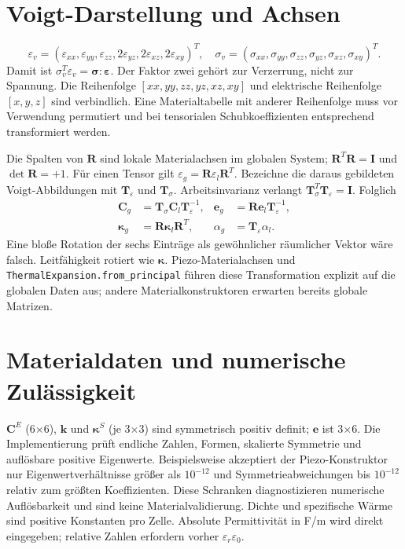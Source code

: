 \section{Voigt-Darstellung und Achsen}
\begin{equation}\label{eq:voigt}
\varepsilon_v=(\varepsilon_{xx},\varepsilon_{yy},\varepsilon_{zz},
2\varepsilon_{yz},2\varepsilon_{xz},2\varepsilon_{xy})^T,
\quad
\sigma_v=(\sigma_{xx},\sigma_{yy},\sigma_{zz},
\sigma_{yz},\sigma_{xz},\sigma_{xy})^T.
\end{equation}
Damit ist $\sigma_v^T\varepsilon_v=\boldsymbol\sigma:\boldsymbol\varepsilon$.
Der Faktor zwei gehört zur Verzerrung, nicht zur Spannung. Die Reihenfolge
$[xx,yy,zz,yz,xz,xy]$ und elektrische Reihenfolge $[x,y,z]$ sind verbindlich.
Eine Materialtabelle mit anderer Reihenfolge muss vor Verwendung permutiert
und bei tensorialen Schubkoeffizienten entsprechend transformiert werden.

Die Spalten von $\mathbf R$ sind lokale Materialachsen im globalen System;
$\mathbf R^T\mathbf R=\mathbf I$ und $\det\mathbf R=+1$. Für einen Tensor gilt
$\varepsilon_g=\mathbf R\varepsilon_l\mathbf R^T$.
Bezeichne die daraus gebildeten Voigt-Abbildungen mit $\mathbf T_\varepsilon$
und $\mathbf T_\sigma$. Arbeitsinvarianz verlangt
$\mathbf T_\sigma^T\mathbf T_\varepsilon=\mathbf I$. Folglich
\begin{align}\label{eq:rotation}
\mathbf C_g&=\mathbf T_\sigma\mathbf C_l\mathbf T_\varepsilon^{-1},&
\mathbf e_g&=\mathbf R\mathbf e_l\mathbf T_\varepsilon^{-1},\\
\boldsymbol\kappa_g&=\mathbf R\boldsymbol\kappa_l\mathbf R^T,&
\alpha_g&=\mathbf T_\varepsilon\alpha_l.\nonumber
\end{align}
Eine bloße Rotation der sechs Einträge als gewöhnlicher räumlicher Vektor wäre
falsch. Leitfähigkeit rotiert wie $\boldsymbol\kappa$. Piezo-Materialachsen und
\texttt{ThermalExpansion.from\_principal} führen diese Transformation explizit
auf die globalen Daten aus; andere Materialkonstruktoren erwarten bereits
globale Matrizen.

\section{Materialdaten und numerische Zulässigkeit}
$\mathbf C^E$ (6$\times$6), $\mathbf k$ und $\boldsymbol\kappa^S$
(je 3$\times$3) sind symmetrisch positiv definit; $\mathbf e$ ist 3$\times$6.
Die Implementierung prüft endliche Zahlen, Formen, skalierte Symmetrie und
auflösbare positive Eigenwerte. Beispielsweise akzeptiert der Piezo-Konstruktor
nur Eigenwertverhältnisse größer als $10^{-12}$ und Symmetrieabweichungen bis
$10^{-12}$ relativ zum größten Koeffizienten. Diese Schranken diagnostizieren
numerische Auflösbarkeit und sind keine Materialvalidierung. Dichte und
spezifische Wärme sind positive Konstanten pro Zelle. Absolute Permittivität
in F/m wird direkt eingegeben; relative Zahlen erfordern vorher $\varepsilon_r
\varepsilon_0$.


